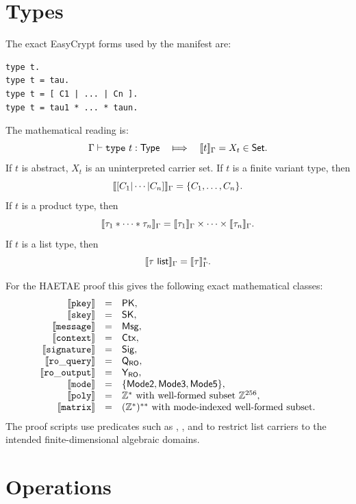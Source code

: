 \section{Types}
\label{app:semantic-types}

The exact EasyCrypt forms used by the manifest are:

\begin{lstlisting}[language=EasyCrypt]
type t.
type t = tau.
type t = [ C1 | ... | Cn ].
type t = tau1 * ... * taun.
\end{lstlisting}

The mathematical reading is:
\[
  \Gamma \vdash \mathtt{type}\ t : \mathsf{Type}
  \quad\Longmapsto\quad
  \ECsem{t}_{\Gamma}=X_t\in\Set.
\]
If \(t\) is abstract, \(X_t\) is an uninterpreted carrier set.  If \(t\) is a
finite variant type, then
\[
  \llbracket [C_1|\cdots|C_n] \rrbracket_{\Gamma}
  =
  \{C_1,\ldots,C_n\}.
\]
If \(t\) is a product type, then
\[
  \llbracket \tau_1*\cdots*\tau_n \rrbracket_{\Gamma}
  =
  \llbracket \tau_1 \rrbracket_{\Gamma}\times\cdots\times\llbracket \tau_n \rrbracket_{\Gamma}.
\]
If \(t\) is a list type, then
\[
  \ECsem{\tau\ \mathsf{list}}_{\Gamma}
  =
  \ECsem{\tau}_{\Gamma}^{*}.
\]

For the HAETAE proof this gives the following exact mathematical classes:
\[
\begin{array}{rcl}
\llbracket \mathtt{pkey} \rrbracket &=& \mathsf{PK},\\
\llbracket \mathtt{skey} \rrbracket &=& \mathsf{SK},\\
\llbracket \mathtt{message} \rrbracket &=& \mathsf{Msg},\\
\llbracket \mathtt{context} \rrbracket &=& \mathsf{Ctx},\\
\llbracket \mathtt{signature} \rrbracket &=& \mathsf{Sig},\\
\llbracket \mathtt{ro\_query} \rrbracket &=& \mathsf{Q}_{\mathsf{RO}},\\
\llbracket \mathtt{ro\_output} \rrbracket &=& \mathsf{Y}_{\mathsf{RO}},\\
\llbracket \mathtt{mode} \rrbracket &=& \{\mathsf{Mode2},\mathsf{Mode3},\mathsf{Mode5}\},\\
\llbracket \mathtt{poly} \rrbracket &=& \mathbb{Z}^{*}\ \text{with well-formed subset } \mathbb{Z}^{256},\\
\llbracket \mathtt{matrix} \rrbracket &=& (\mathbb{Z}^{*})^{* *}\ \text{with mode-indexed well-formed subset}.
\end{array}
\]
The proof scripts use predicates such as ,
, and  to restrict list carriers to
the intended finite-dimensional algebraic domains.

\section{Operations}
\label{app:semantic-ops}


